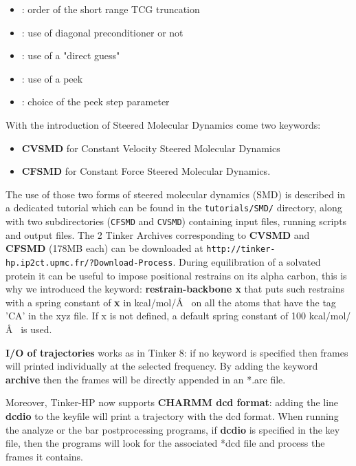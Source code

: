\documentclass[peerreview]{IEEEtran}
\newlength{\mylen}
\begin{document}
\begin{itemize}
\item[] : order of the short range TCG truncation
\item[] : use of diagonal preconditioner or not
\item[] : use of a "direct guess"
\item[] : use of a peek 
\item[] : choice of the peek step parameter
\end{itemize}

\vskip5mm
With the introduction of Steered Molecular Dynamics come two keywords:
\begin{itemize}
\item[] \textbf{CVSMD} for Constant Velocity Steered Molecular Dynamics
\item[]\textbf{CFSMD} for Constant Force Steered Molecular Dynamics.
\end{itemize}

 The use of those two forms of steered molecular dynamics (SMD) is described in a dedicated tutorial which can be found in the \texttt{tutorials/SMD/} directory, along with two subdirectories (\texttt{CFSMD} and \texttt{CVSMD}) containing input files, running scripts and output files. The 2 Tinker Archives corresponding to \textbf{CVSMD} and \textbf{CFSMD} (178MB each) can be downloaded at \texttt{http://tinker-hp.ip2ct.upmc.fr/?Download-Process}.
\vskip5mm
During equilibration of a solvated protein it can be useful to impose positional restrains on its alpha carbon, this is why we introduced the keyword: \textbf{restrain-backbone x} that puts such restrains with a spring constant of \textbf{x} in kcal/mol/\AA~ on all the atoms that have the tag 'CA' in the xyz file. If x is not defined, a default spring constant of 100 kcal/mol/\AA~ is used.

\vskip5mm
\textbf{I/O of trajectories} works as in Tinker 8: if no keyword is specified then frames will printed individually at the selected frequency. By adding the keyword \textbf{archive} then the frames will be directly appended in an *.arc file.

Moreover, Tinker-HP now supports \textbf{CHARMM dcd format}: adding the line \textbf{dcdio} to the keyfile will print a trajectory with the dcd format. When running the analyze or the bar postprocessing programs, if \textbf{dcdio} is specified in the key file, then the programs will look for the associated *dcd file and process the frames it contains.
\end{document}
